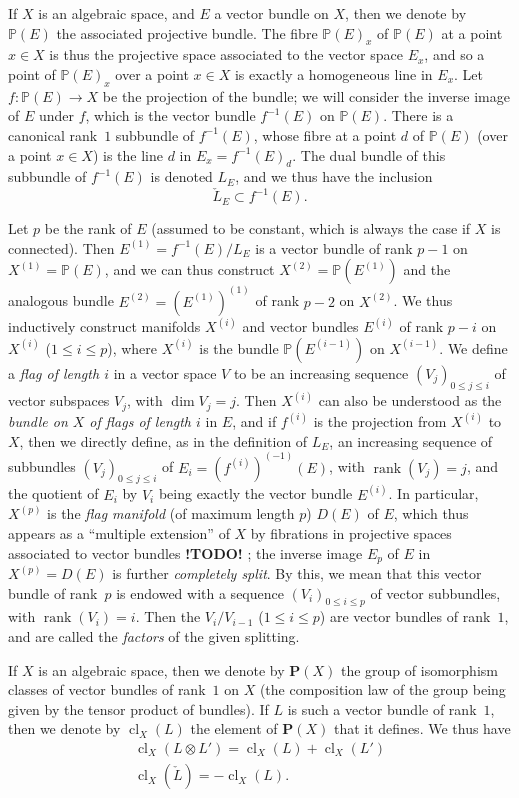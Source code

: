 \documentclass{article}
\theoremstyle{plain}
\theoremstyle{definition}
\newcommand{\PP}{\mathbf{P}}
\renewcommand{\leq}{\leqslant}
\DeclareMathOperator{\rank}{rank}
\DeclareMathOperator{\cl}{cl}
\newcommand{\todo}{\textbf{ !TODO! }}
\newcommand{\oldpage}[1]{\marginpar{\footnotesize$\Big\vert$ \textit{p.~#1}}}
\begin{document}
If $X$ is an algebraic space, and $E$ a vector bundle on $X$, then we denote by $\mathbb{P}(E)$ the associated projective bundle.
The fibre $\mathbb{P}(E)_x$ of $\mathbb{P}(E)$ at a point $x\in X$ is thus the projective space associated to the vector space $E_x$, and so a point of $\mathbb{P}(E)_x$ over a point $x\in X$ is exactly a homogeneous line in $E_x$.
Let $f\colon\mathbb{P}(E)\to X$ be the projection of the bundle;
we will consider the inverse image of $E$ under $f$, which is the vector bundle $f^{-1}(E)$ on $\mathbb{P}(E)$.
There is a canonical rank~$1$ subbundle of $f^{-1}(E)$, whose fibre at a point $d$ of $\mathbb{P}(E)$ (over a point $x\in X$) is the line $d$ in $E_x=f^{-1}(E)_d$.
The dual bundle of this subbundle of $f^{-1}(E)$ is denoted $L_E$, and we thus have the inclusion
\[
  \check{L}_E \subset f^{-1}(E).
\]

Let $p$ be the rank of $E$ (assumed to be constant, which is always the case if $X$ is connected).
Then $E^{(1)}=f^{-1}(E)/L_E$ is a vector bundle of rank $p-1$ on $X^{(1)}=\mathbb{P}(E)$, and we can thus construct $X^{(2)}=\mathbb{P}(E^{(1)})$ and the analogous bundle $E^{(2)}=(E^{(1)})^{(1)}$ of rank $p-2$ on $X^{(2)}$.
We thus inductively construct manifolds $X^{(i)}$ and vector bundles $E^{(i)}$ of rank $p-i$ on $X^{(i)}$ ($1\leq i\leq p$), where $X^{(i)}$ is the bundle $\mathbb{P}(E^{(i-1)})$ on $X^{(i-1)}$.
We define a \emph{flag of length $i$} in a vector space $V$ to be an increasing sequence $(V_j)_{0\leq j\leq i}$ of vector subspaces $V_j$, with $\dim V_j=j$.
Then $X^{(i)}$ can also be understood as the \emph{bundle on $X$ of flags of length $i$} in $E$, and if $f^{(i)}$ is the projection from $X^{(i)}$ to $X$, then we directly define, as in the definition of $L_E$, an increasing sequence of subbundles $(V_j)_{0\leq j\leq i}$ of $E_i=(f^{(i)})^{(-1)}(E)$, with $\rank(V_j)=j$, and the quotient of $E_i$ by $V_i$ being exactly the vector bundle $E^{(i)}$.
In particular, $X^{(p)}$ is the \emph{flag manifold} (of maximum length $p$) $D(E)$ of $E$, which thus appears as a ``multiple extension'' of $X$ by fibrations in projective spaces associated to vector bundles\todo;
the inverse image $E_p$ of $E$ in $X^{(p)}=D(E)$ is further \emph{completely split}.
By this, we mean that this vector bundle of rank~$p$ is endowed with a sequence $(V_i)_{0\leq i\leq p}$ of vector subbundles,
\oldpage{139}
with $\rank(V_i)=i$.
Then the $V_i/V_{i-1}$ ($1\leq i\leq p$) are vector bundles of rank~$1$, and are called the \emph{factors} of the given splitting.

If $X$ is an algebraic space, then we denote by $\PP(X)$ the group of isomorphism classes of vector bundles of rank~$1$ on $X$ (the composition law of the group being given by the tensor product of bundles).
If $L$ is such a vector bundle of rank~$1$, then we denote by $\cl_X(L)$ the element of $\PP(X)$ that it defines.
We thus have
\begin{gather*}
  \cl_X(L\otimes L') = \cl_X(L) + \cl_X(L')
\\\cl_X(\check{L}) = -\cl_X(L).
\end{gather*}
\end{document}
